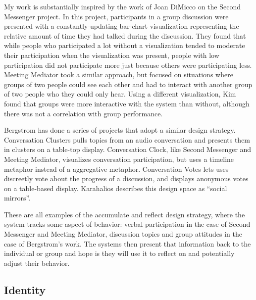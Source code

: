 \documentclass{tufte-handout}
\begin{document}
My work is substantially inspired by the work of Joan DiMicco on the Second Messenger project. \cite{second_messenger} In this project, participants in a group discussion were presented with a constantly-updating bar-chart visualization representing the relative amount of time they had talked during the discussion. They found that while people who participated a lot without a visualization tended to moderate their participation when the visualization was present, people with low participation did not participate more just because others were participating less. Meeting Mediator \cite{meeting_mediator} took a similar approach, but focused on situations where groups of two people could see each other and had to interact with another group of two people who they could only hear. Using a different visualization, Kim found that groups were more interactive with the system than without, although there was not a correlation with group performance. 

Bergstrom has done a series of projects that adopt a similar design strategy. Conversation Clusters pulls topics from an audio conversation and presents them in clusters on a table-top display. \cite{conv_clusters} Conversation Clock, like Second Messenger and Meeting Mediator, visualizes conversation participation, but uses a timeline metaphor instead of a aggregative metaphor. \cite{conv_clock} Conversation Votes lets uses discreetly vote about the progress of a discussion, and displays anonymous votes on a table-based display.\cite{conv_votes} Karahalios describes this design space as ``social mirrors''. \cite{social_mirrors}


These are all examples of the accumulate and reflect design strategy, where the system tracks some aspect of behavior: verbal participation in the case of Second Messenger and Meeting Mediator, discussion topics and group attitudes in the case of Bergstrom's work. The systems then present that information back to the individual or group and hope is they will use it to reflect on and potentially adjust their behavior. 



\subsection{Identity}

\end{document}

